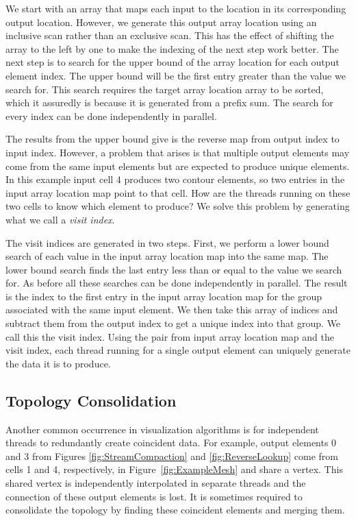 \documentclass{superfri}
\newcommand*{\keyterm}[1]{\emph{#1}}
\begin{document}
We start with an array that maps each input to the location in its
corresponding output location. However, we generate this output array
location using an inclusive scan rather than an exclusive scan. This has
the effect of shifting the array to the left by one to make the indexing of
the next step work better. The next step is to search for the upper bound
of the array location for each output element index. The upper bound will
be the first entry greater than the value we search for. This search
requires the target array location array to be sorted, which it assuredly
is because it is generated from a prefix sum. The search for every index
can be done independently in parallel.

The results from the upper bound give is the reverse map from output index
to input index. However, a problem that arises is that multiple output
elements may come from the same input elements but are expected to produce
unique elements. In this example input cell 4 produces two contour
elements, so two entries in the input array location map point to that
cell. How are the threads running on these two cells to know which element
to produce? We solve this problem by generating what we call a
\keyterm{visit index}.

The visit indices are generated in two steps. First, we perform a lower
bound search of each value in the input array location map into the same
map. The lower bound search finds the last entry less than or equal to the
value we search for. As before all these searches can be done independently
in parallel. The result is the index to the first entry in the input array
location map for the group associated with the same input element. We then
take this array of indices and subtract them from the output index to get
a unique index into that group. We call this the visit index. Using the
pair from input array location map and the visit index, each thread running
for a single output element can uniquely generate the data it is to
produce.

\subsection{Topology Consolidation}

\noindent
Another common occurrence in visualization algorithms is for independent
threads to redundantly create coincident data. For example, output elements
0 and 3 from Figures \ref{fig:StreamCompaction} and \ref{fig:ReverseLookup}
come from cells 1 and 4, respectively, in Figure~\ref{fig:ExampleMesh} and
share a vertex. This shared vertex is independently interpolated in
separate threads and the connection of these output elements is lost. It is
sometimes required to consolidate the topology by finding these coincident
elements and merging them.
\end{document}
